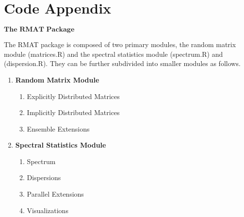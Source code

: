 \chapter{Code Appendix}

$\textbf{The RMAT Package}$ \hfill \newline

\noindent
The RMAT package is composed of two primary modules, the random matrix module (matrices.R) and the spectral statistics module (spectrum.R) and (dispersion.R). They can be further subdivided into smaller modules as follows.

\begin{enumerate}
  \item \textbf{Random Matrix Module}
    \begin{enumerate}
      \item Explicitly Distributed Matrices
      \item Implicitly Distributed Matrices
      \item Ensemble Extensions
    \end{enumerate}

  \item \textbf{Spectral Statistics Module}
    \begin{enumerate}
      \item Spectrum
      \item Dispersions
      \item Parallel Extensions
      \item Visualizations
    \end{enumerate}
\end{enumerate}





